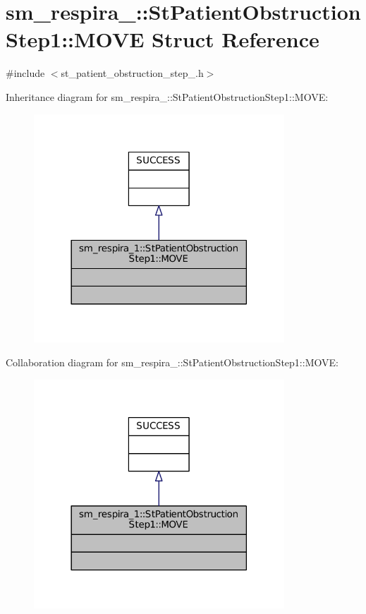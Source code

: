 \hypertarget{structsm__respira__1_1_1StPatientObstructionStep1_1_1MOVE}{}\section{sm\+\_\+respira\+\_\+:\+:St\+Patient\+Obstruction\+Step1\+:\+:M\+O\+VE Struct Reference}
\label{structsm__respira__1_1_1StPatientObstructionStep1_1_1MOVE}


{\ttfamily \#include $<$st\+\_\+patient\+\_\+obstruction\+\_\+step\+\_.\+h$>$}



Inheritance diagram for sm\+\_\+respira\+\_\+:\+:St\+Patient\+Obstruction\+Step1\+:\+:M\+O\+VE\+:
\nopagebreak
\begin{figure}[H]
\begin{center}
\leavevmode
\includegraphics[width=266pt]{structsm__respira__1_1_1StPatientObstructionStep1_1_1MOVE__inherit__graph}
\end{center}
\end{figure}


Collaboration diagram for sm\+\_\+respira\+\_\+:\+:St\+Patient\+Obstruction\+Step1\+:\+:M\+O\+VE\+:
\nopagebreak
\begin{figure}[H]
\begin{center}
\leavevmode
\includegraphics[width=266pt]{structsm__respira__1_1_1StPatientObstructionStep1_1_1MOVE__coll__graph}
\end{center}
\end{figure}


